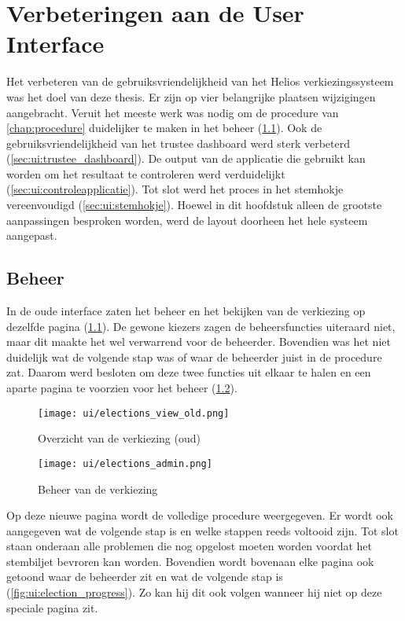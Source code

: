%
%

\chapter{Verbeteringen aan de User Interface}
\label{chap:interface}

Het verbeteren van de gebruiksvriendelijkheid van het Helios verkiezingssysteem was het doel van deze thesis. Er zijn op vier belangrijke plaatsen wijzigingen aangebracht. Veruit het meeste werk was nodig om de procedure van \ref{chap:procedure} duidelijker te maken in het beheer (\ref{sec:ui:beheer}). Ook de gebruiksvriendelijkheid van het trustee dashboard werd sterk verbeterd (\ref{sec:ui:trustee_dashboard}). De output van de applicatie die gebruikt kan worden om het resultaat te controleren werd verduidelijkt (\ref{sec:ui:controleapplicatie}). Tot slot werd het proces in het stemhokje vereenvoudigd (\ref{sec:ui:stemhokje}). Hoewel in dit hoofdstuk alleen de grootste aanpassingen besproken worden, werd de layout doorheen het hele systeem aangepast.

\section{Beheer}
\label{sec:ui:beheer}

In de oude interface zaten het beheer en het bekijken van de verkiezing op dezelfde pagina (\ref{fig:ui:elections_view_old}). De gewone kiezers zagen de beheersfuncties uiteraard niet, maar dit maakte het wel verwarrend voor de beheerder. Bovendien was het niet duidelijk wat de volgende stap was of waar de beheerder juist in de procedure zat. Daarom werd besloten om deze twee functies uit elkaar te halen en een aparte pagina te voorzien voor het beheer (\ref{fig:ui:elections_admin}).

\begin{figure}
  \centering
  \texttt{[image: ui/elections\_view\_old.png]}
  \caption{Overzicht van de verkiezing (oud)}
  \label{fig:ui:elections_view_old}
\end{figure}

\begin{figure}
  \centering
  \texttt{[image: ui/elections\_admin.png]}
  \caption{Beheer van de verkiezing}
  \label{fig:ui:elections_admin}
\end{figure}

\npar Op deze nieuwe pagina wordt de volledige procedure weergegeven. Er wordt ook aangegeven wat de volgende stap is en welke stappen reeds voltooid zijn. Tot slot staan onderaan alle problemen die nog opgelost moeten worden voordat het stembiljet bevroren kan worden. Bovendien wordt bovenaan elke pagina ook getoond waar de beheerder zit en wat de volgende stap is (\ref{fig:ui:election_progress}). Zo kan hij dit ook volgen wanneer hij niet op deze speciale pagina zit.

